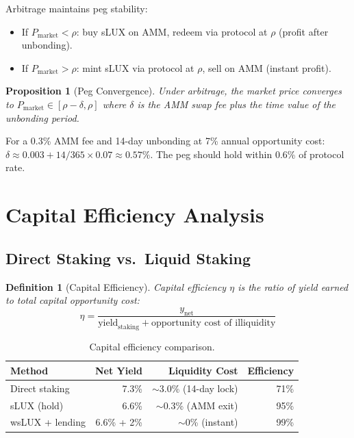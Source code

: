 \documentclass[11pt,a4paper]{article}
\newtheorem{proposition}[theorem]{Proposition}
\newtheorem{definition}{Definition}
\begin{document}
Arbitrage maintains peg stability:
\begin{itemize}
    \item If $P_{\text{market}} < \rho$: buy sLUX on AMM, redeem via protocol at $\rho$ (profit after unbonding).
    \item If $P_{\text{market}} > \rho$: mint sLUX via protocol at $\rho$, sell on AMM (instant profit).
\end{itemize}

\begin{proposition}[Peg Convergence]
Under arbitrage, the market price converges to $P_{\text{market}} \in [\rho - \delta, \rho]$ where $\delta$ is the AMM swap fee plus the time value of the unbonding period.
\end{proposition}

For a 0.3\% AMM fee and 14-day unbonding at 7\% annual opportunity cost: $\delta \approx 0.003 + 14/365 \times 0.07 \approx 0.57\%$. The peg should hold within 0.6\% of protocol rate.

\section{Capital Efficiency Analysis}\label{sec:efficiency}

\subsection{Direct Staking vs.\ Liquid Staking}

\begin{definition}[Capital Efficiency]
Capital efficiency $\eta$ is the ratio of yield earned to total capital opportunity cost:
\begin{equation}
    \eta = \frac{y_{\text{net}}}{\text{yield}_{\text{staking}} + \text{opportunity cost of illiquidity}}
\end{equation}
\end{definition}

\begin{table}[H]
\centering
\caption{Capital efficiency comparison.}
\label{tab:efficiency}
\begin{tabular}{lrrr}
\toprule
\textbf{Method} & \textbf{Net Yield} & \textbf{Liquidity Cost} & \textbf{Efficiency} \\
\midrule
Direct staking & 7.3\% & $\sim$3.0\% (14-day lock) & 71\% \\
sLUX (hold) & 6.6\% & $\sim$0.3\% (AMM exit) & 95\% \\
wsLUX + lending & 6.6\% + 2\% & $\sim$0\% (instant) & 99\% \\
\bottomrule
\end{tabular}
\end{table}
\end{document}
